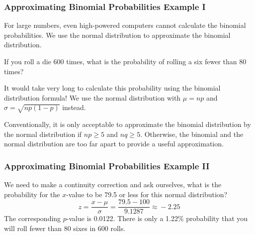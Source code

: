 \documentclass[xcolor=dvipsnames]{beamer}
\begin{document}
\begin{frame}
  \frametitle{Approximating Binomial Probabilities Example I}
  For large numbers, even high-powered computers cannot calculate the
  binomial probabilities. We use the normal distribution to
  approximate the binomial distribution. 

\bigskip

   If you roll a die 600 times, what is the
  probability of rolling a six fewer than 80 times? 

\bigskip

  It would take very long to calculate this probability using the
  binomial distribution formula! We use the normal distribution with
  $\mu=np$ and $\sigma=\sqrt{np(1-p)}$ instead. 

\bigskip

  Conventionally, it is only acceptable to approximate the binomial
  distribution by the normal distribution if $np\geq{}5$ and
  $nq\geq{}5$. Otherwise, the binomial and the normal distribution are
  too far apart to provide a useful approximation.
\end{frame}

\begin{frame}
  \frametitle{Approximating Binomial Probabilities Example II}
  We need to make a \alert{continuity correction} and ask ourselves,
  what is the probability for the $x$-value to be 79.5 or less for
  this normal distribution?
  \begin{equation}
    \label{eq:oolojuth}
    z=\frac{x-\mu}{\sigma}=\frac{79.5-100}{9.1287}\approx{}-2.25
  \end{equation}
  The corresponding $p$-value is 0.0122. There is only a 1.22\%
  probability that you will roll fewer than 80 sixes in 600 rolls.
\end{frame}
\end{document}

